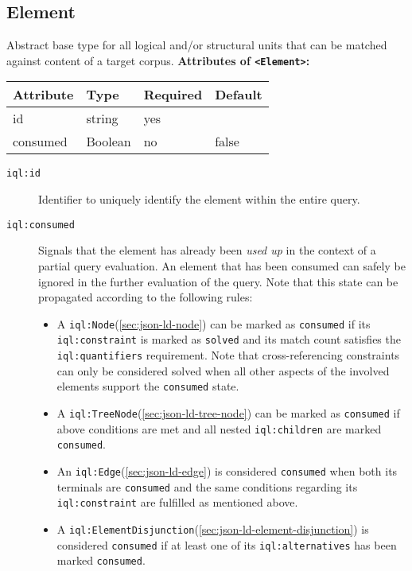 \documentclass[11pt]{article}
\newcommand{\compresslist}{ %
	\setlength{\topsep}{0pt}
	\setlength{\itemsep}{1pt}
	\setlength{\parskip}{0pt}
	\setlength{\parsep}{0pt}
}
\newcommand{\iqlns}{iql:}
\newcommand{\iqlType}[1]{\texttt{\iqlns#1}}
\newcommand{\iqlBaseType}[1]{\texttt{\textless#1\textgreater}}
\newcommand{\desc}[1]{\noindent#1\newline\medskip}
\newenvironment{attributes}[1]{
\noindent\textbf{Attributes of #1:}\newline\medskip
\begin{tabular}{|p{0.3\textwidth}|p{0.20\textwidth}|p{0.20\textwidth}|p{0.17\textwidth}|}
	\hline
	\textbf{Attribute} & \textbf{Type} & \textbf{Required} & \textbf{Default} \\ 
	\hline
	\hline
}{
\end{tabular}
}
\newcommand{\attribute}[4]{
	#1 & #2 & #3 & #4 \\
	\hline
}
\begin{document}
\subsection{Element}
\label{sec:json-ld-element}
\desc{Abstract base type for all logical and/or structural units that can be matched against content of a target corpus.}
\begin{attributes}{\iqlBaseType{Element}}
	\attribute{id}{string}{yes}{}
	\attribute{consumed}{Boolean}{no}{false}
\end{attributes}
\begin{description}
	\item[\iqlType{id}] Identifier to uniquely identify the element within the entire query.
	\item[\iqlType{consumed}] Signals that the element has already been \textit{used up} in the context of a partial query evaluation. An element that has been consumed can safely be ignored in the further evaluation of the query. Note that this state can be propagated according to the following rules:
	\begin{itemize}[leftmargin=*,topsep=0pt]\compresslist
		\item A \iqlType{Node}(\ref{sec:json-ld-node}) can be marked as \texttt{consumed} if its \iqlType{constraint} is marked as \texttt{solved} and its match count satisfies the \iqlType{quantifiers} requirement. Note that cross-referencing constraints can only be considered solved when all other aspects of the involved elements support the \texttt{consumed} state.
		\item A \iqlType{TreeNode}(\ref{sec:json-ld-tree-node}) can be marked as \texttt{consumed} if above conditions are met and all nested \iqlType{children} are marked \texttt{consumed}.
		\item An \iqlType{Edge}(\ref{sec:json-ld-edge}) is considered \texttt{consumed} when both its terminals are \texttt{consumed} and the same conditions regarding its \iqlType{constraint} are fulfilled as mentioned above.
		\item A \iqlType{ElementDisjunction}(\ref{sec:json-ld-element-disjunction}) is considered \texttt{consumed} if at least one of its \iqlType{alternatives} has been marked \texttt{consumed}.
	\end{itemize}
\end{description}
\end{document}
